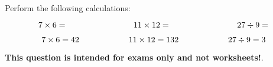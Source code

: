 

Perform the following calculations:

$$7 \times 6 = \hbox{\hskip 80pt} 11 \times 12 = \hbox{\hskip 80pt} 27 \div 9 = $$







$$7 \times 6 = 42 \hbox{\hskip 60pt} 11 \times 12 = 132 \hbox{\hskip 60pt} 27 \div 9 = 3$$







{\bf This question is intended for exams only and not worksheets!}.




